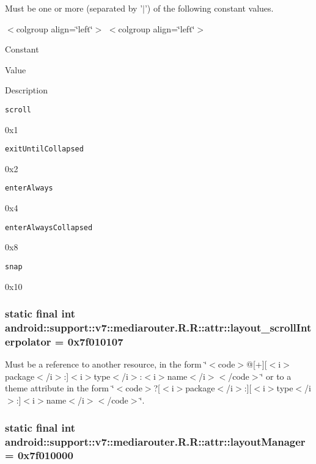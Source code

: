 Must be one or more (separated by '$|$') of the following constant values. \begin{TabularC}{0}
\hline
\end{TabularC}
$<$colgroup align=\char`\"{}left\char`\"{}$>$ $<$colgroup align=\char`\"{}left\char`\"{}$>$ 

Constant

Value

Description 

{\tt scroll}

0x1

{\tt exitUntilCollapsed}

0x2

{\tt enterAlways}

0x4

{\tt enterAlwaysCollapsed}

0x8

{\tt snap}

0x10\hypertarget{classandroid_1_1support_1_1v7_1_1mediarouter_1_1_r_1_1attr_216b3aef534f4a838a50e43c7d085985}{
\subsubsection[{layout\_\-scrollInterpolator}]{\setlength{\rightskip}{0pt plus 5cm}static final int android::support::v7::mediarouter.R.R::attr::layout\_\-scrollInterpolator = 0x7f010107}}
\label{classandroid_1_1support_1_1v7_1_1mediarouter_1_1_r_1_1attr_216b3aef534f4a838a50e43c7d085985}


Must be a reference to another resource, in the form \char`\"{}$<$code$>$@\mbox{[}+\mbox{]}\mbox{[}$<$i$>$package$<$/i$>$:\mbox{]}$<$i$>$type$<$/i$>$:$<$i$>$name$<$/i$>$$<$/code$>$\char`\"{} or to a theme attribute in the form \char`\"{}$<$code$>$?\mbox{[}$<$i$>$package$<$/i$>$:\mbox{]}\mbox{[}$<$i$>$type$<$/i$>$:\mbox{]}$<$i$>$name$<$/i$>$$<$/code$>$\char`\"{}. \hypertarget{classandroid_1_1support_1_1v7_1_1mediarouter_1_1_r_1_1attr_776f05090184756508d1ca27ad318411}{
\subsubsection[{layoutManager}]{\setlength{\rightskip}{0pt plus 5cm}static final int android::support::v7::mediarouter.R.R::attr::layoutManager = 0x7f010000}}
\label{classandroid_1_1support_1_1v7_1_1mediarouter_1_1_r_1_1attr_776f05090184756508d1ca27ad318411}


